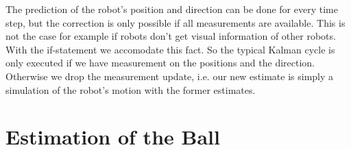 
\parskip 20pt

The prediction of the robot's position and direction can be done for every time step, but the correction is only possible if all measurements are available. This is not the case for example if robots don't get visual information of other robots. With the if-statement we accomodate this fact. So the typical Kalman cycle is only executed if we have measurement on the positions and the direction. Otherwise we drop the measurement update, i.e. our new estimate is simply a simulation of the robot's motion with the former estimates.

\section{Estimation of the Ball}